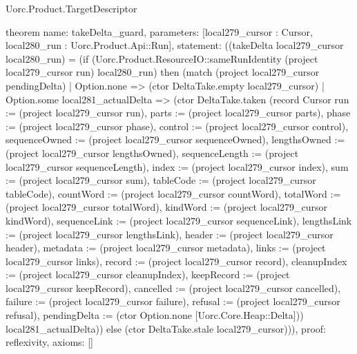 \begin{lexlean}{Uorc.Product.TargetDescriptor}
\begin{semanticmodule}
theorem{
  name: takeDelta_guard,
  parameters: [local279_cursor : Cursor, local280_run : Uorc.Product.Api::Run],
  statement: ((takeDelta local279_cursor local280_run) = (if (Uorc.Product.ResourceIO::sameRunIdentity (project local279_cursor run) local280_run) then (match (project local279_cursor pendingDelta)
    | Option.none => (ctor DeltaTake.empty local279_cursor)
    | Option.some local281_actualDelta => (ctor DeltaTake.taken (record Cursor {run := (project local279_cursor run), parts := (project local279_cursor parts), phase := (project local279_cursor phase), control := (project local279_cursor control), sequenceOwned := (project local279_cursor sequenceOwned), lengthsOwned := (project local279_cursor lengthsOwned), sequenceLength := (project local279_cursor sequenceLength), index := (project local279_cursor index), sum := (project local279_cursor sum), tableCode := (project local279_cursor tableCode), countWord := (project local279_cursor countWord), totalWord := (project local279_cursor totalWord), kindWord := (project local279_cursor kindWord), sequenceLink := (project local279_cursor sequenceLink), lengthsLink := (project local279_cursor lengthsLink), header := (project local279_cursor header), metadata := (project local279_cursor metadata), links := (project local279_cursor links), record := (project local279_cursor record), cleanupIndex := (project local279_cursor cleanupIndex), keepRecord := (project local279_cursor keepRecord), cancelled := (project local279_cursor cancelled), failure := (project local279_cursor failure), refusal := (project local279_cursor refusal), pendingDelta := (ctor Option.none [Uorc.Core.Heap::Delta])}) local281_actualDelta)) else (ctor DeltaTake.stale local279_cursor))),
  proof: reflexivity{},
  axioms: []
}
\end{semanticmodule}
\end{lexlean}
